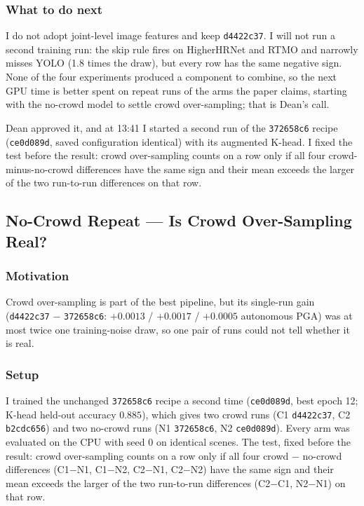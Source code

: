 \subsubsection{What to do next}

I do not adopt joint-level image features and keep \texttt{d4422c37}.
I will not run a second training run: the skip rule fires on HigherHRNet and RTMO and narrowly misses YOLO (1.8 times the draw), but every row has the same negative sign.
None of the four experiments produced a component to combine, so the next GPU time is better spent on repeat runs of the arms the paper claims, starting with the no-crowd model to settle crowd over-sampling; that is Dean's call.

Dean approved it, and at 13:41 I started a second run of the \texttt{372658c6} recipe (\texttt{ce0d089d}, saved configuration identical) with its augmented K-head.
I fixed the test before the result: crowd over-sampling counts on a row only if all four crowd-minus-no-crowd differences have the same sign and their mean exceeds the larger of the two run-to-run differences on that row.

\subsection{No-Crowd Repeat --- Is Crowd Over-Sampling Real?}

\subsubsection{Motivation}

Crowd over-sampling is part of the best pipeline, but its single-run gain (\texttt{d4422c37} $-$ \texttt{372658c6}: $+0.0013$ / $+0.0017$ / $+0.0005$ autonomous PGA) was at most twice one training-noise draw, so one pair of runs could not tell whether it is real.

\subsubsection{Setup}

I trained the unchanged \texttt{372658c6} recipe a second time (\texttt{ce0d089d}, best epoch 12; K-head held-out accuracy $0.885$), which gives two crowd runs (C1 \texttt{d4422c37}, C2 \texttt{b2cdc656}) and two no-crowd runs (N1 \texttt{372658c6}, N2 \texttt{ce0d089d}).
Every arm was evaluated on the CPU with seed 0 on identical scenes.
The test, fixed before the result: crowd over-sampling counts on a row only if all four crowd $-$ no-crowd differences (C1$-$N1, C1$-$N2, C2$-$N1, C2$-$N2) have the same sign and their mean exceeds the larger of the two run-to-run differences (C2$-$C1, N2$-$N1) on that row.

